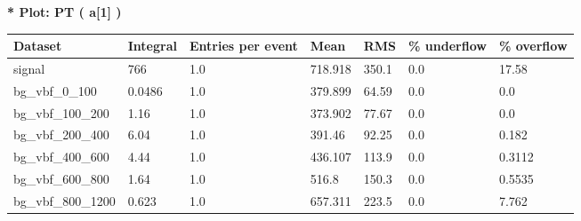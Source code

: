 \documentclass[a4paper, 10pt]{article}
\begin{document}
\textbf{* Plot: PT ( a[1] ) }\\
   \begin{table}[H]
  \begin{center}
    \begin{tabular}{|m{23.0mm}|m{23.0mm}|m{18.0mm}|m{19.0mm}|m{19.0mm}|m{19.0mm}|m{19.0mm}|}
      \hline
      {\cellcolor{yellow}         Dataset}& {\cellcolor{yellow}         Integral}& {\cellcolor{yellow}         Entries per event}& {\cellcolor{yellow}         Mean}& {\cellcolor{yellow}         RMS}& {\cellcolor{yellow}         \% underflow}& {\cellcolor{yellow}         \% overflow}\\
      \hline
      {\cellcolor{white}         signal}& {\cellcolor{white}         766}& {\cellcolor{white}         1.0}& {\cellcolor{white}         718.918}& {\cellcolor{white}         350.1}& {\cellcolor{red}         0.0}& {\cellcolor{red}         17.58}\\
      \hline
      {\cellcolor{white}         bg\_vbf\_0\_100}& {\cellcolor{white}         0.0486}& {\cellcolor{white}         1.0}& {\cellcolor{white}         379.899}& {\cellcolor{white}         64.59}& {\cellcolor{green}         0.0}& {\cellcolor{green}         0.0}\\
      \hline
      {\cellcolor{white}         bg\_vbf\_100\_200}& {\cellcolor{white}         1.16}& {\cellcolor{white}         1.0}& {\cellcolor{white}         373.902}& {\cellcolor{white}         77.67}& {\cellcolor{green}         0.0}& {\cellcolor{green}         0.0}\\
      \hline
      {\cellcolor{white}         bg\_vbf\_200\_400}& {\cellcolor{white}         6.04}& {\cellcolor{white}         1.0}& {\cellcolor{white}         391.46}& {\cellcolor{white}         92.25}& {\cellcolor{green}         0.0}& {\cellcolor{green}         0.182}\\
      \hline
      {\cellcolor{white}         bg\_vbf\_400\_600}& {\cellcolor{white}         4.44}& {\cellcolor{white}         1.0}& {\cellcolor{white}         436.107}& {\cellcolor{white}         113.9}& {\cellcolor{green}         0.0}& {\cellcolor{green}         0.3112}\\
      \hline
      {\cellcolor{white}         bg\_vbf\_600\_800}& {\cellcolor{white}         1.64}& {\cellcolor{white}         1.0}& {\cellcolor{white}         516.8}& {\cellcolor{white}         150.3}& {\cellcolor{green}         0.0}& {\cellcolor{green}         0.5535}\\
      \hline
      {\cellcolor{white}         bg\_vbf\_800\_1200}& {\cellcolor{white}         0.623}& {\cellcolor{white}         1.0}& {\cellcolor{white}         657.311}& {\cellcolor{white}         223.5}& {\cellcolor{orange}         0.0}& {\cellcolor{orange}         7.762}\\

\end{tabular}
\end{center}
\end{table}
\end{document}
